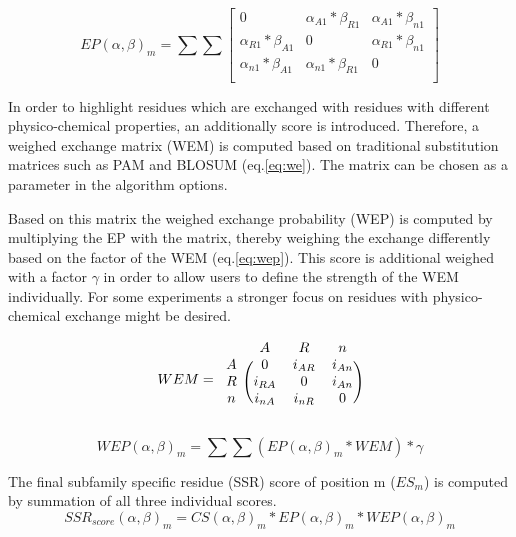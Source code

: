 \documentclass[a4paper,10pt]{article}
\begin{document}
\begin{equation}  \label{eq:diff}
EP(\alpha,\beta)_m =
  \sum \sum
  \begin{bmatrix}
    0 & \alpha_{A1} * \beta_{R1} & \alpha_{A1} * \beta_{n1} \\
    \alpha_{R1} * \beta_{A1} & 0 & \alpha_{R1} * \beta_{n1} \\
    \alpha_{n1} * \beta_{A1} & \alpha_{n1} * \beta_{R1} & 0 \\
  \end{bmatrix}
\end{equation}

In order to highlight residues which are exchanged with
residues with different physico-chemical properties, an additionally
score is introduced. Therefore, a weighed exchange matrix (WEM)
is computed based on traditional substitution matrices such as PAM and BLOSUM (eq.\ref{eq:we}). 
The matrix can be chosen as a parameter in the algorithm options.

Based on this matrix the weighed exchange probability (WEP) is computed by multiplying the
EP with the matrix, thereby weighing the exchange differently based on the factor of the WEM (eq.\ref{eq:wep}).
This score is additional weighed with a factor $\gamma$ in order to allow users to define the strength of the 
WEM individually. For some experiments a stronger focus on residues with physico-chemical exchange might be desired.

\begin{equation}  \label{eq:we}
WEM =
\begin{blockarray}{cccc}
 & A & R  & n  \\
\begin{block}{c(ccc)}
  A & 0 & i_{AR}  & i_{An} \\
  R & i_{RA} & 0  &  i_{An} \\
  n & i_{nA} &  i_{nR}  & 0 \\
\end{block}
\end{blockarray}
\end{equation}

\begin{equation} \label{eq:wep}
WEP(\alpha,\beta)_m = \sum\sum (EP(\alpha,\beta)_m * WEM) * \gamma
\end{equation}

The final subfamily specific residue (SSR) score of position m ($ES_m$) is computed by 
summation of all three individual scores.
\begin{equation}
SSR_{score}(\alpha, \beta)_m = CS(\alpha, \beta)_m * EP(\alpha, \beta)_m * WEP(\alpha, \beta)_m 
\end{equation}
\end{document}
